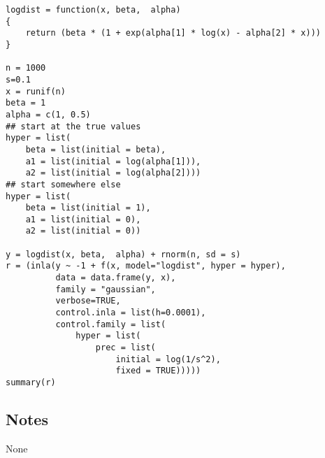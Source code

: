 \documentclass[a4paper,11pt]{article}
\begin{document}
\begin{verbatim}
logdist = function(x, beta,  alpha)
{
    return (beta * (1 + exp(alpha[1] * log(x) - alpha[2] * x)))
}

n = 1000
s=0.1
x = runif(n)
beta = 1
alpha = c(1, 0.5)
## start at the true values
hyper = list(
    beta = list(initial = beta), 
    a1 = list(initial = log(alpha[1])),
    a2 = list(initial = log(alpha[2])))
## start somewhere else
hyper = list(
    beta = list(initial = 1), 
    a1 = list(initial = 0), 
    a2 = list(initial = 0))

y = logdist(x, beta,  alpha) + rnorm(n, sd = s)
r = (inla(y ~ -1 + f(x, model="logdist", hyper = hyper), 
          data = data.frame(y, x),
          family = "gaussian",
          verbose=TRUE, 
          control.inla = list(h=0.0001), 
          control.family = list(
              hyper = list(
                  prec = list(
                      initial = log(1/s^2),
                      fixed = TRUE)))))
summary(r)
\end{verbatim}

\subsection*{Notes}
None
\end{document}
